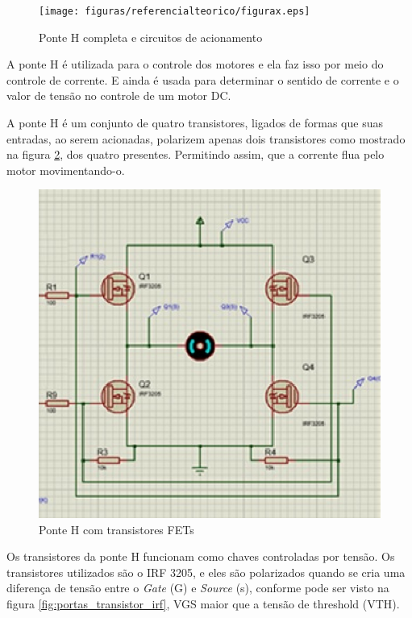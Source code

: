 \begin{figure}[!htb]
	\centering
	\texttt{[image: figuras/referencialteorico/figurax.eps]}
	\caption{Ponte H completa e circuitos de acionamento}
	\label{fig:ponteh}
\end{figure}

A ponte H é utilizada para o controle dos motores e ela faz isso por meio do controle de corrente. E ainda é usada para determinar o sentido de corrente e o valor de tensão no controle de um motor DC.

A ponte H é um conjunto de quatro transistores, ligados de formas que suas entradas, ao serem acionadas, polarizem apenas dois transistores como mostrado na figura \ref{fig:ponteh_fets}, dos quatro presentes. Permitindo assim, que a corrente flua pelo motor movimentando-o.

\begin{figure}[!htb]
	\centering
	\includegraphics[keepaspectratio=true,scale=1]{figuras/referencialteorico/figurax_1.eps}
	\caption{Ponte H com transistores FETs}
	\label{fig:ponteh_fets}
\end{figure}

Os transistores da ponte H funcionam como chaves controladas por tensão. Os transistores utilizados são o IRF 3205, e eles são polarizados quando se cria uma diferença de tensão entre o \textit{Gate} (G) e \textit{Source} (s), conforme pode ser visto na figura \ref{fig:portas_transistor_irf}, VGS maior que a tensão de threshold (VTH).

